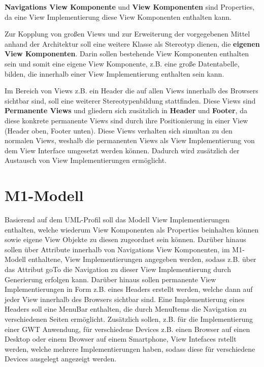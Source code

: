 \textbf{Navigations View Komponente} und \textbf{View Komponenten} sind
Properties, da eine View Implementierung diese View Komponenten enthalten kann.

Zur Kopplung von großen Views und zur Erweiterung der vorgegebenen Mittel anhand
der Architektur soll eine weitere Klasse als Stereotyp dienen, die
\textbf{eigenen View Komponenten}. Darin sollen bestehende View Komponenten
enthalten sein und somit eine eigene View Komponente, z.B. eine große
Datentabelle, bilden, die innerhalb einer View Implementierung enthalten sein
kann.

Im Bereich von Views z.B. ein Header die auf allen Views innerhalb des Browsers
sichtbar sind, soll eine weiterer Stereotypenbildung stattfinden. Diese Views
sind \textbf{Permanente Views} und gliedern sich zusätzlich in \textbf{Header}
und \textbf{Footer}, da diese konkrete permanente Views sind durch ihre
Positionierung in einer View (Header oben, Footer unten). Diese Views verhalten
sich simultan zu den normalen Views, weshalb die permanenten Views als View
Implementierung von dem View Interface umgesetzt werden können. Dadurch wird
zusätzlich der Austausch von View Implementierungen ermöglicht.
\section{M1-Modell}\label{AufBM1}
Basierend auf dem UML-Profil soll das Modell View Implementierungen enthalten,
welche wiederum View Komponenten als Properties beinhalten können sowie eigene
View Objekte zu diesen zugeordnet sein können. Darüber hinaus sollen über
Attribute innerhalb von Navigations View Komponenten, im M1-Modell enthaltene,
View Implementierungen angegeben werden, sodass z.B. über das Attribut goTo die
Navigation zu dieser View Implementierung durch Generierung erfolgen kann.
Darüber hinaus sollen permanente View Implementierungen in Form z.B. eines
Headers erstellt werden, welche dann auf jeder View innerhalb des Browsers
sichtbar sind. Eine Implementierung eines Headers soll eine MenuBar enthalten,
die durch MenuItems die Navigation zu verschiedenen Seiten ermöglicht.
Zusätzlich sollen, z.B. für die Implementierung einer GWT Anwendung, für
verschiedene Devices z.B. einen Browser auf einen Desktop oder einem Browser auf
einem Smartphone, View Intefaces rstellt werden, welche mehrere
Implementierungen haben, sodass diese für verschiedene Devices ausgelegt angezeigt werden.
